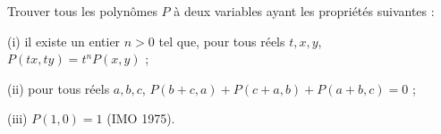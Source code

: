 Trouver tous les polynômes $P$ à deux variables ayant les propriétés suivantes :

(i) il existe un entier $n > 0$ tel que, pour tous réels $t, x, y$, $P(tx, ty) = t^nP(x, y)$ ;

(ii) pour tous réels $a, b, c$, $P(b + c, a) + P(c + a, b) + P(a + b, c) = 0$ ;

(iii) $P(1, 0) = 1$ (IMO 1975).
